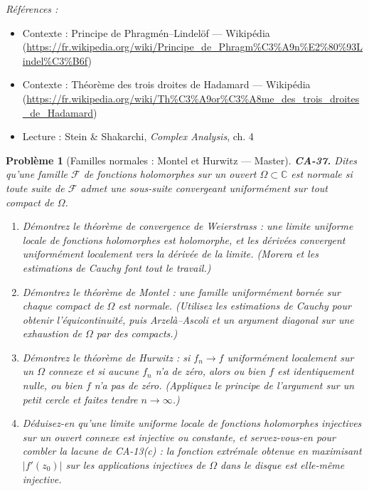 \documentclass[11pt]{article}
\newtheorem{problem}{Problème}
\newenvironment{refs}{\par\small\noindent\emph{Références :}\begin{itemize}\setlength\itemsep{0pt}}{\end{itemize}\normalsize}
\begin{document}
\begin{refs}
\item Contexte : Principe de Phragmén--Lindelöf --- Wikipédia (\url{https://fr.wikipedia.org/wiki/Principe_de_Phragm%C3%A9n%E2%80%93Lindel%C3%B6f})
\item Contexte : Théorème des trois droites de Hadamard --- Wikipédia (\url{https://fr.wikipedia.org/wiki/Th%C3%A9or%C3%A8me_des_trois_droites_de_Hadamard})
\item Lecture : Stein \& Shakarchi, \textit{Complex Analysis}, ch. 4
\end{refs}

\bigskip

\begin{problem}[{Familles normales : Montel et Hurwitz --- Master}]
\textbf{CA-37.} Dites qu'une famille $ \mathcal{F} $ de fonctions holomorphes sur un ouvert
$ \Omega \subset \mathbb{C} $ est \textit{normale} si toute suite de $ \mathcal{F} $ admet une
sous-suite convergeant uniformément sur tout compact de $ \Omega $.
\begin{enumerate}
\item[(a)] Démontrez le théorème de convergence de Weierstrass : une limite uniforme locale de fonctions
holomorphes est holomorphe, et les dérivées convergent uniformément localement vers la dérivée de la
limite. (Morera et les estimations de Cauchy font tout le travail.)
\item[(b)] Démontrez le théorème de Montel : une famille uniformément bornée sur chaque compact de
$ \Omega $ est normale. (Utilisez les estimations de Cauchy pour obtenir l'équicontinuité, puis
Arzelà--Ascoli et un argument diagonal sur une exhaustion de $ \Omega $ par des compacts.)
\item[(c)] Démontrez le théorème de Hurwitz : si $ f_n \to f $ uniformément localement sur un
$ \Omega $ connexe et si aucune $ f_n $ n'a de zéro, alors ou bien $ f $ est identiquement
nulle, ou bien $ f $ n'a pas de zéro. (Appliquez le principe de l'argument sur un petit cercle et
faites tendre $ n \to \infty $.)
\item[(d)] Déduisez-en qu'une limite uniforme locale de fonctions holomorphes injectives sur un ouvert
connexe est injective ou constante, et servez-vous-en pour combler la lacune de CA-13(c) : la
fonction extrémale obtenue en maximisant $ |f'(z_0)| $ sur les applications injectives de
$ \Omega $ dans le disque est elle-même injective.
\end{enumerate}

\end{problem}
\end{document}
